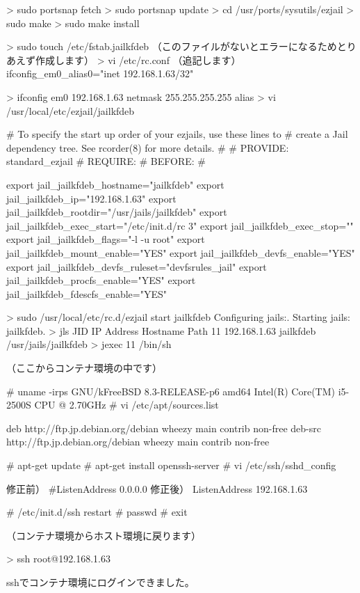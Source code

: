 \documentclass[mingoth,a4paper]{jsarticle}
\begin{document}
\begin{commandline}
> sudo portsnap fetch
> sudo portsnap update
> cd /usr/ports/sysutils/ezjail
> sudo make
> sudo make install

> sudo touch /etc/fstab.jailkfdeb
  （このファイルがないとエラーになるためとりあえず作成します）
> vi /etc/rc.conf
（追記します）
ifconfig_em0_alias0="inet 192.168.1.63/32"

> ifconfig em0 192.168.1.63 netmask 255.255.255.255 alias
> vi /usr/local/etc/ezjail/jailkfdeb

# To specify the start up order of your ezjails, use these lines to
# create a Jail dependency tree. See rcorder(8) for more details.
#
# PROVIDE: standard_ezjail
# REQUIRE:
# BEFORE:
#

export jail_jailkfdeb_hostname="jailkfdeb"
export jail_jailkfdeb_ip="192.168.1.63"
export jail_jailkfdeb_rootdir="/usr/jails/jailkfdeb"
export jail_jailkfdeb_exec_start="/etc/init.d/rc 3"
export jail_jailkfdeb_exec_stop=""
export jail_jailkfdeb_flags="-l -u root"
export jail_jailkfdeb_mount_enable="YES"
export jail_jailkfdeb_devfs_enable="YES"
export jail_jailkfdeb_devfs_ruleset="devfsrules_jail"
export jail_jailkfdeb_procfs_enable="YES"
export jail_jailkfdeb_fdescfs_enable="YES"


> sudo /usr/local/etc/rc.d/ezjail start jailkfdeb
Configuring jails:.
Starting jails: jailkfdeb.
> jls
   JID  IP Address      Hostname                      Path
    11  192.168.1.63    jailkfdeb                     /usr/jails/jailkfdeb
> jexec 11 /bin/sh

（ここからコンテナ環境の中です）

# uname -irps
GNU/kFreeBSD 8.3-RELEASE-p6 amd64 Intel(R) Core(TM) i5-2500S CPU @ 2.70GHz
# vi /etc/apt/sources.list

deb http://ftp.jp.debian.org/debian wheezy main contrib non-free
deb-src http://ftp.jp.debian.org/debian wheezy main contrib non-free

# apt-get update
# apt-get install openssh-server
# vi /etc/ssh/sshd_config

修正前）  #ListenAddress 0.0.0.0
修正後）  ListenAddress 192.168.1.63

# /etc/init.d/ssh restart
# passwd
# exit

（コンテナ環境からホスト環境に戻ります）

> ssh root@192.168.1.63 
\end{commandline}

sshでコンテナ環境にログインできました。
\end{document}
